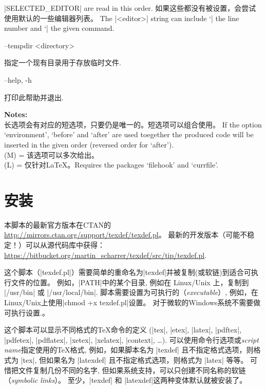 \documentclass{article}
\newenvironment{options}{%
    \def\cstart{\begingroup\ttfamily\par\noindent\ignorespaces}%
    \def\csep{\endgroup\begingroup\list {}{}\item \relax}%
    \def\cend{\endlist\par\medskip\endgroup\cstart}%
    \cstart
}{%
    \endgroup
}
\begin{document}
\begin{options}
                                                       |SELECTED_EDITOR| are read in this order. 如果这些都没有被设置，会尝试使用默认的一些编辑器列表。
                                                       The |<editor>| string can include `|%
                                                       the line number and `|%
                                                       the given command.\cend
  --tempdir <directory>                              \csep 指定一个现有目录用于存放临时文件.\cend
  --help, -h                                         \csep 打印此帮助并退出.\cend
\end{options}

\noindent \textbf{Notes:}\\
长选项会有对应的短选项，只要仍是唯一的。短选项可以组合使用。
 If the option `environment', `before' and `after' are used toegether the
 produced code will be inserted in the given order (reversed order for `after').\\
 (M) = 该选项可以多次给出。\\
 (L) = 仅针对LaTeX。Requires the packages `filehook' and `currfile'.


\section{安装}\label{sec:install}

本脚本的最新官方版本在CTAN的\url{http://mirrors.ctan.org/support/texdef/texdef.pl}。
最新的开发版本（可能不稳定！）可以从源代码库中获得：
\url{https://bitbucket.org/martin_scharrer/texdef/src/tip/texdef.pl}.

这个脚本（|texdef.pl|）需要简单的重命名为|texdef|并被复制(或软链)到适合可执行文件的位置。
例如，|PATH|中的某个目录, 例如在 Linux/Unix 上，复制到 |/usr/bin| 或 |/usr/local/bin|.
脚本需要设置为可执行的（\emph{executable}）, 例如，在Linux/Unix上使用|chmod +x texdef.pl|设置。
对于微软的Windows系统不需要做可执行设置.。

这个脚本可以显示不同格式的TeX命令的定义
(|tex|, |etex|, |latex|, |pdftex|, |pdfetex|, |pdflatex|, |xetex|, |xelatex|, |context|, \ldots).
可以使用命令行选项或\emph{script name}指定使用的TeX格式,
例如，如果脚本名为 |texdef| 且不指定格式选项，则格式为 |tex|, 但如果名为 |latexdef| 且不指定格式选项，则格式为
 |latex| 等等。
可惜把文件复制几份不同的名字, 但如果系统支持，可以只创建不同名称的软链（\emph{symbolic links}）。
至少，|texdef| 和 |latexdef|这两种变体默认就被安装了。
\end{document}
